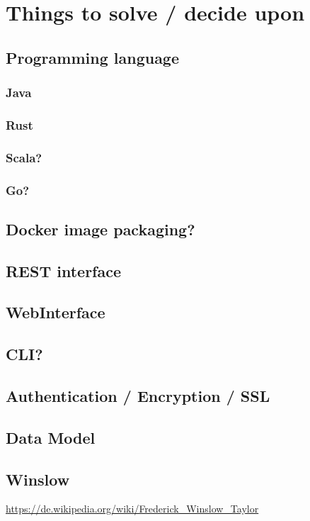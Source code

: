 \chapter{Things to solve / decide upon}

\section{Programming language}

\subsection{Java}
\subsection{Rust}
\subsection{Scala?}
\subsection{Go?}

\section{Docker image packaging?}

\section{REST interface}

\section{WebInterface}

\section{CLI?}

\section{Authentication / Encryption / SSL}

\section{Data Model}


\section{Winslow}
\url{https://de.wikipedia.org/wiki/Frederick_Winslow_Taylor}